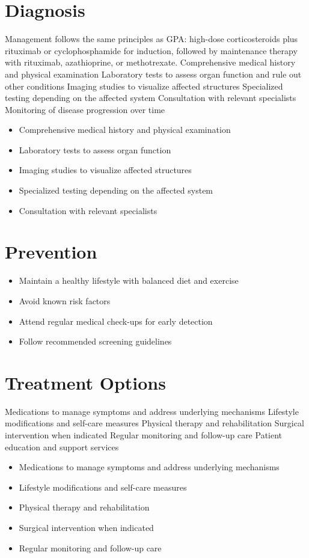 \section{Diagnosis}
Management follows the same principles as GPA: high-dose corticosteroids plus rituximab or cyclophosphamide for induction, followed by maintenance therapy with rituximab, azathioprine, or methotrexate. Comprehensive medical history and physical examination Laboratory tests to assess organ function and rule out other conditions Imaging studies to visualize affected structures Specialized testing depending on the affected system Consultation with relevant specialists Monitoring of disease progression over time

\begin{itemize}[noitemsep]
  \item Comprehensive medical history and physical examination
  \item Laboratory tests to assess organ function
  \item Imaging studies to visualize affected structures
  \item Specialized testing depending on the affected system
  \item Consultation with relevant specialists
\end{itemize}
\section{Prevention}
\begin{itemize}[noitemsep]
  \item Maintain a healthy lifestyle with balanced diet and exercise
  \item Avoid known risk factors
  \item Attend regular medical check-ups for early detection
  \item Follow recommended screening guidelines
\end{itemize}
\section{Treatment Options}
Medications to manage symptoms and address underlying mechanisms Lifestyle modifications and self-care measures Physical therapy and rehabilitation Surgical intervention when indicated Regular monitoring and follow-up care Patient education and support services

\begin{itemize}[noitemsep]
  \item Medications to manage symptoms and address underlying mechanisms
  \item Lifestyle modifications and self-care measures
  \item Physical therapy and rehabilitation
  \item Surgical intervention when indicated
  \item Regular monitoring and follow-up care
\end{itemize}
